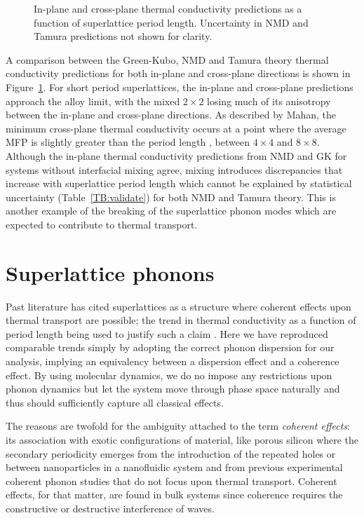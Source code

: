 \documentclass[aps,prb,preprint,preprintnumbers,amsmath,amssymb,floatfix,superscriptaddress]{revtex4}
\begin{document}
\begin{figure}%
\begin{center}
\renewcommand{\figure}{Fig.}
\caption{In-plane and cross-plane thermal conductivity predictions as a function of superlattice period length. Uncertainty in NMD and Tamura predictions not shown for clarity.}
\label{FIG:NMD_v_GK}
\end{center}
\end{figure}

A comparison between the Green-Kubo, NMD and Tamura theory thermal conductivity predictions for both in-plane and cross-plane directions is shown in Figure~\ref{FIG:NMD_v_GK}. For short period superlattices, the in-plane and cross-plane predictions approach the alloy limit, with the mixed $2\times 2$ losing much of its anisotropy between the in-plane and cross-plane directions. As described by Mahan, the minimum cross-plane thermal conductivity occurs at a point where the average MFP is slightly greater than the period length \cite{PhysRevLett.84.927}, between $4 \times 4$ and $8 \times 8$. Although the in-plane thermal conductivity predictions from NMD and GK for systems without interfacial mixing agree, mixing introduces discrepancies that increase with superlattice period length which cannot be explained by statistical uncertainty (Table~\ref{TB:validate}) for both NMD and Tamura theory. This is another example of the breaking of the superlattice phonon modes which are expected to contribute to thermal transport.

\section{Superlattice phonons}

Past literature has cited superlattices as a structure where coherent effects upon thermal transport are possible; the trend in thermal conductivity as a function of period length being used to justify such a claim \cite{PhysRevB.67.195311,PhysRevB.72.174302,PhysRevB.61.3091}. Here we have reproduced comparable trends simply by adopting the correct phonon dispersion for our analysis, implying an equivalency between a dispersion effect and a coherence effect. By using molecular dynamics, we do no impose any restrictions upon phonon dynamics but let the system move through phase space naturally and thus should sufficiently capture all classical effects.

The reasons are twofold for the ambiguity attached to the term \textit {coherent effects}: its association with exotic configurations of material, like porous silicon \cite{doi:10.1021/nl102918q} where the secondary periodicity emerges from the introduction of the repeated holes or between nanoparticles in a nanofluidic system \cite{Keblinski2002855} and from previous experimental coherent phonon studies \cite{PhysRevLett.73.740,PhysRevB.75.195309} that do not focus upon thermal transport. Coherent effects, for that matter, are found in bulk systems since coherence requires the constructive or destructive interference of waves.
\end{document}
